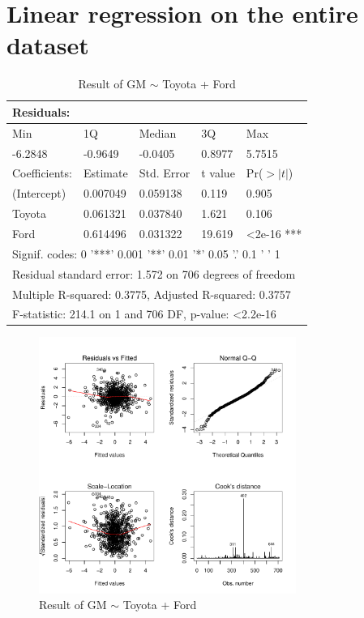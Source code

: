 \documentclass[11pt, conference]{IEEEtran}
\begin{document}
\newpage
\appendices

\setcounter{figure}{0}
\setcounter{table}{0}  


\section{Linear regression on the entire dataset}

\begin{table}[!h]
\centering
\caption{Result of GM $\sim$ Toyota + Ford}
\begin{tabular}{lllll}
\hline
Residuals:        &             &               &           &                       \\
\hline
Min               & 1Q          & Median        & 3Q        & Max                   \\
-6.2848           & -0.9649     & -0.0405       & 0.8977    & 5.7515                \\
\hline
\hline
Coefficients:     & Estimate    & Std. Error    & t value   & Pr($>|t|$)   \\
\hline
(Intercept)       & 0.007049     & 0.059138       & 0.119    & 0.905  \\
Toyota				   & 0.061321   & 0.037840     & 1.621     & 0.106 \\
Ford               & 0.614496     & 0.031322       & 19.619     & \textless2e-16         ***\\
\hline
\hline
\multicolumn{5}{l}{Signif. codes:  0 '***' 0.001 '**' 0.01 '*' 0.05 '.' 0.1 ' ' 1}  \\
\multicolumn{5}{l}{Residual standard error: 1.572 on 706 degrees of freedom}        \\
\multicolumn{5}{l}{Multiple R-squared:  0.3775,    Adjusted R-squared:  0.3757}     \\
\multicolumn{5}{l}{F-statistic: 214.1 on 1 and 706 DF,  p-value: \textless 2.2e-16} \\
\hline

\end{tabular}
\end{table}

\begin{figure}[!h]
\centering
\includegraphics[width=3.3in]{fig2.pdf}
\caption{Result of GM $\sim$ Toyota + Ford}
\end{figure}
\end{document}
